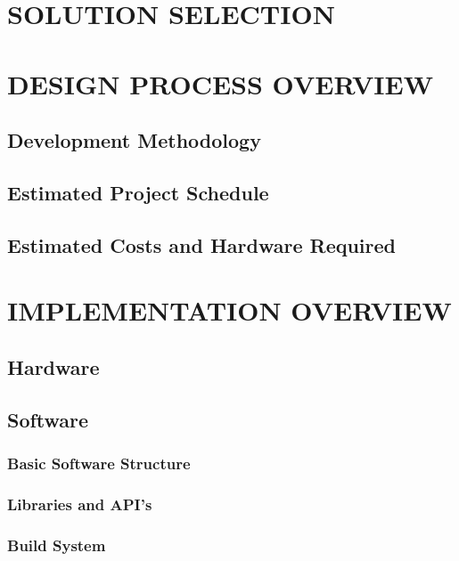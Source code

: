 \documentclass[10pt,twocolumn]{witseiepaper}
\begin{document}
\section{SOLUTION SELECTION}

\section{DESIGN PROCESS OVERVIEW}
	\subsection{Development Methodology}
	\subsection{Estimated Project Schedule}
	\subsection{Estimated Costs and Hardware Required}

\section{IMPLEMENTATION OVERVIEW}
	\subsection{Hardware}

	\subsection{Software}
		\subsubsection{Basic Software Structure}
		\subsubsection{Libraries and API's}

		\subsubsection{Build System}
\end{document}
